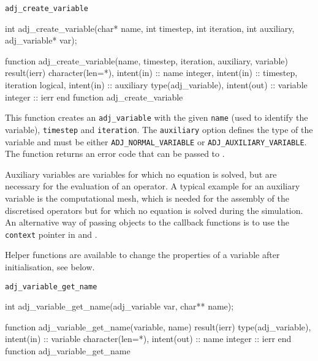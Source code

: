 
\begin{boxwithtitle}{\texttt{adj_create_variable}}
\begin{minipage}{\columnwidth}
\begin{ccode}
  int adj_create_variable(char* name, int timestep, int iteration, int auxiliary, 
                          adj_variable* var);
\end{ccode}
\begin{fortrancode}
  function adj_create_variable(name, timestep, iteration, auxiliary, variable) 
           result(ierr)
    character(len=*), intent(in) :: name
    integer, intent(in) :: timestep, iteration
    logical, intent(in) :: auxiliary
    type(adj_variable), intent(out) :: variable
    integer :: ierr
  end function adj_create_variable
\end{fortrancode}
\end{minipage}
\end{boxwithtitle}

This function creates an \texttt{adj_variable} with the given \texttt{name} (used to identify the variable), \texttt{timestep} and \texttt{iteration}.
The \texttt{auxiliary} option defines the type of the variable and must be either \texttt{ADJ_NORMAL_VARIABLE} or \texttt{ADJ_AUXILIARY_VARIABLE}.
The function returns an error code that can be passed to .

Auxiliary variables are variables for which no equation is solved, but are necessary for the evaluation of an operator.
A typical example for an auxiliary variable is the computational mesh, which is needed for the assembly of the discretised operators but for which no equation is solved during the simulation.
An alternative way of passing objects to the callback functions is to use the \texttt{context} pointer in  and .

Helper functions are available to change the properties of a variable after initialisation, see below. 



\begin{boxwithtitle}{\texttt{adj_variable_get_name}}
\begin{minipage}{\columnwidth}
\begin{ccode}
  int adj_variable_get_name(adj_variable var, char** name);
\end{ccode}
\begin{fortrancode}
  function adj_variable_get_name(variable, name) result(ierr)
    type(adj_variable), intent(in) :: variable
    character(len=*), intent(out) :: name
    integer :: ierr
  end function adj_variable_get_name
\end{fortrancode}
\end{minipage}
\end{boxwithtitle}

